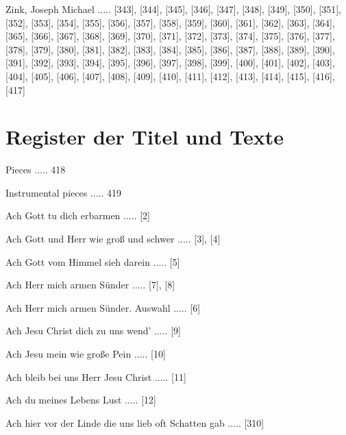\documentclass[twocolumn]{book}
\begin{document}
\newline 
Zink, Joseph Michael ..... [343], [344], [345], [346], [347], [348], [349], [350], [351], [352], [353], [354], [355], [356], [357], [358], [359], [360], [361], [362], [363], [364], [365], [366], [367], [368], [369], [370], [371], [372], [373], [374], [375], [376], [377], [378], [379], [380], [381], [382], [383], [384], [385], [386], [387], [388], [389], [390], [391], [392], [393], [394], [395], [396], [397], [398], [399], [400], [401], [402], [403], [404], [405], [406], [407], [408], [409], [410], [411], [412], [413], [414], [415], [416], [417]
    \clearpage  
    \chapter*{\centering Register der Titel und Texte}
\fancyhead{}


 Pieces ..... 418

 Instrumental pieces ..... 419

\newline 
Ach Gott tu dich erbarmen ..... [2]

\newline 
Ach Gott und Herr wie groß und schwer ..... [3], [4]

\newline 
Ach Gott vom Himmel sieh darein ..... [5]

\newline 
Ach Herr mich armen Sünder ..... [7], [8]

\newline 
Ach Herr mich armen Sünder. Auswahl ..... [6]

\newline 
Ach Jesu Christ dich zu uns wend' ..... [9]

\newline 
Ach Jesu mein wie große Pein ..... [10]

\newline 
Ach bleib bei uns Herr Jesu Christ ..... [11]

\newline 
Ach du meines Lebens Lust ..... [12]

\newline 
Ach hier vor der Linde die uns lieb oft Schatten gab ..... [310]
\end{document}
